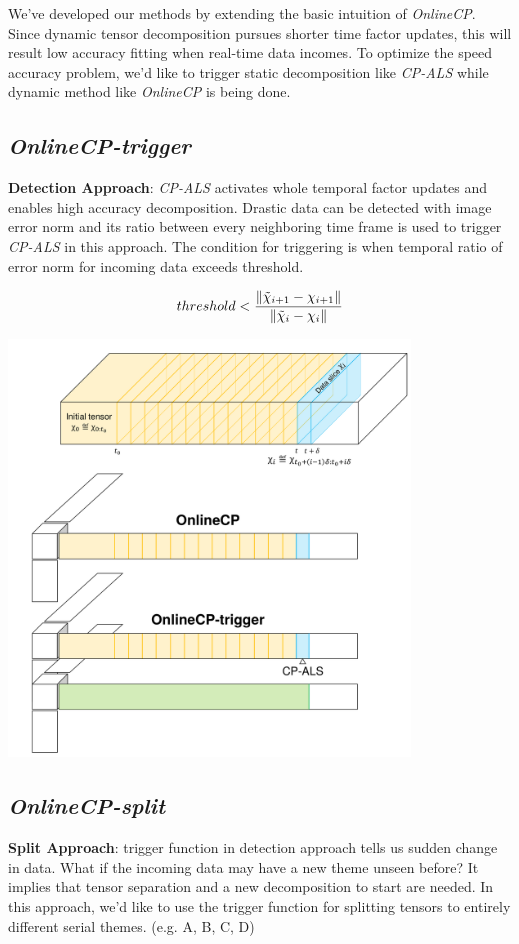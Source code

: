 
We've developed our methods by extending the basic intuition of \textit{OnlineCP}. Since dynamic tensor decomposition pursues shorter time factor updates, this will result low accuracy fitting when real-time data incomes. To optimize the speed accuracy problem, we'd like to trigger static decomposition like \textit{CP-ALS} while dynamic method like \textit{OnlineCP} is being done.

\subsection{\em OnlineCP-trigger}
\textbf{Detection Approach}: \textit{CP-ALS} activates whole temporal factor updates and enables high accuracy decomposition. Drastic data can be detected with image error norm and its ratio between every neighboring time frame is used to trigger \textit{CP-ALS} in this approach. The condition for triggering is when temporal ratio of error norm for incoming data exceeds threshold.

\begin{align*}
    threshold < \frac{\left\lVert\tilde{\chi}_{i+1}-\chi_{i+1}\right\rVert}{\left\lVert\tilde{\chi}_{i}-\chi_{i}\right\rVert}
\end{align*}

\begin{center}
	\includegraphics[width=0.8\textwidth]{FIG/OnlineCP-trigger.png}
\end{center}

\newpage
\subsection{\em OnlineCP-split}
\textbf{Split Approach}: trigger function in detection approach tells us sudden change in data. What if the incoming data may have a new theme unseen before? It implies that tensor separation and a new decomposition to start are needed. In this approach, we'd like to use the trigger function for splitting tensors to entirely different serial themes. (e.g. A, B, C, D)

